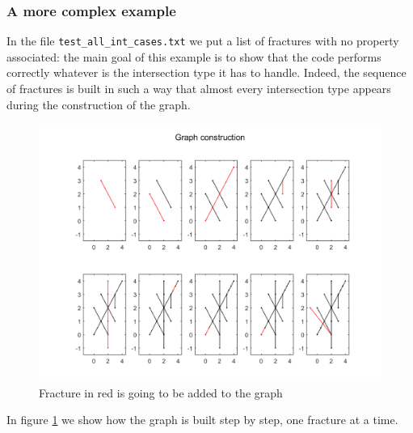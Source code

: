 \documentclass[10pt]{article} %
\begin{document}
	\subsubsection{A more complex example}
	In the file \texttt{test\_all\_int\_cases.txt} we put a list of fractures with no property associated: the main goal of this example is to show that the code performs correctly whatever is the intersection type it has to handle. Indeed, the sequence of fractures is built in such a way that almost every intersection type appears during the construction of the graph. 
	\begin{figure}
		\centering 
		\includegraphics[width=1\textwidth]{graph_building_process}
		\caption{Fracture in red is going to be added to the graph}
		\label{fig:graph_steps}
	\end{figure}
	In figure \ref{fig:graph_steps} we show how the graph is built step by step, one fracture at a time.
	
\end{document}
